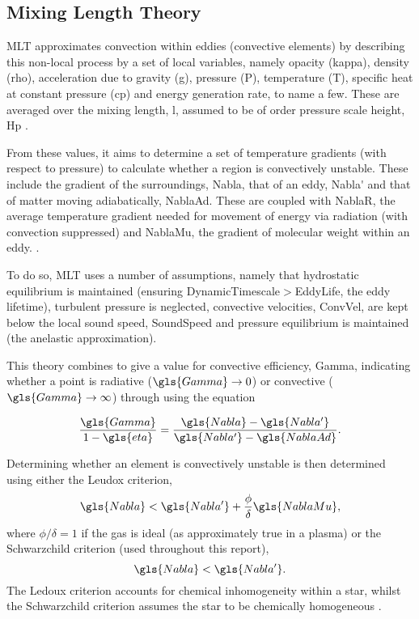\subsection{Mixing Length Theory}\label{sec: MLT_Background}

\gls{MLT} approximates convection within eddies (convective elements) by describing this non-local process by a set of local variables, namely opacity (\gls{kappa}), density (\gls{rho}), acceleration due to gravity (\gls{g}), pressure (\gls{P}), temperature (\gls{T}), specific heat at constant pressure (\gls{cp}) and energy generation rate, to name a few. These are averaged over the mixing length, \gls{l}, assumed to be of order pressure scale height, \gls{Hp} \citep{Weiss04}.

From these values, it aims to determine a set of temperature gradients (with respect to pressure) to calculate whether a region is convectively unstable. These include the gradient of the surroundings, \gls{Nabla}, that of an eddy, \gls{Nabla'} and that of matter moving adiabatically, \gls{NablaAd}. These are coupled with \gls{NablaR}, the average temperature gradient needed for movement of energy via radiation (with convection suppressed) and \gls{NablaMu}, the gradient of molecular weight within an eddy. \citep{Weiss04,Anders23}. 

To do so, \gls{MLT} uses a number of assumptions, namely that hydrostatic equilibrium is maintained (ensuring \gls{DynamicTimescale}$>$\gls{EddyLife}, the eddy lifetime), turbulent pressure is neglected, convective velocities, \gls{ConvVel}, are kept below the local sound speed, \gls{SoundSpeed} and pressure equilibrium is maintained (the anelastic approximation).

This theory combines to give a value for convective efficiency, \gls{Gamma}, indicating whether a point is radiative ($\gls{Gamma} \rightarrow 0$) or convective ($\gls{Gamma} \rightarrow \infty$) through using the equation

\begin{equation}
    \frac{\gls{Gamma}}{1-\gls{eta}}=\frac{\gls{Nabla}-\gls{Nabla'}}{\gls{Nabla'}-\gls{NablaAd}}.
\end{equation}

Determining whether an element is convectively unstable is then determined using either the Leudox criterion,
\begin{equation}
    \gls{Nabla}<\gls{Nabla'}+\frac{\phi}{\delta}\gls{NablaMu},
\end{equation}
where $\phi/\delta = 1$ if the gas is ideal (as approximately true in a plasma) or the Schwarzchild criterion (used throughout this report),
\begin{equation}
    \gls{Nabla}<\gls{Nabla'}.
\end{equation}
The Ledoux criterion accounts for chemical inhomogeneity within a star, whilst the Schwarzchild criterion assumes the star to be chemically homogeneous \citep{Weiss04,Steinkirch12,Jermyn23}.

